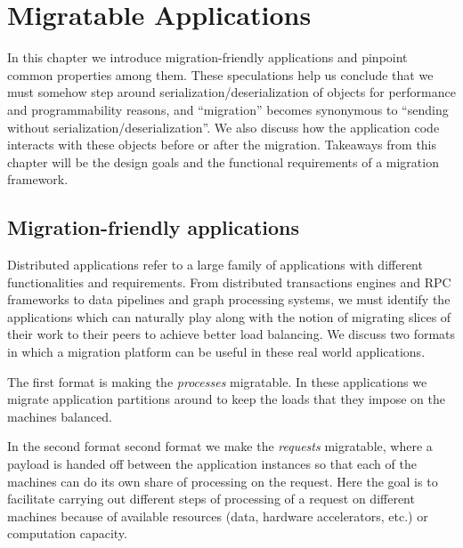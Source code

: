 \chapter{Migratable Applications}
\label{chap:migratableapps}

In this chapter we introduce migration-friendly applications and pinpoint
common properties among them. These speculations help us conclude that
we must somehow step around serialization/deserialization of objects for
performance and programmability reasons, and ``migration'' becomes
synonymous to ``sending without serialization/deserialization''.
We also discuss how the
application code interacts with these objects before or after the migration.
Takeaways from this chapter will be the design goals and the functional
requirements of a migration framework.
%
%
%
%


\section{Migration-friendly applications}
Distributed applications refer to a large family of applications with
different functionalities and requirements. From distributed transactions
engines and RPC frameworks to data pipelines and graph processing systems,
we must identify the
applications which can naturally play along with the notion of migrating
slices of their work to their peers to achieve better load balancing.
We discuss two formats in which a migration platform can be useful in these
real world applications.

The first format is making the
\emph{processes} migratable. In these applications we migrate
application partitions around to keep the loads that they impose on the
machines balanced.

In the second format second format we make the
\emph{requests} migratable, where a payload is handed off between the
application instances so that each of the machines can do its own
share of processing on the request. Here the goal is to facilitate carrying out
different steps of processing of a request on different machines because of
available resources (data, hardware accelerators, etc.) or computation capacity.

